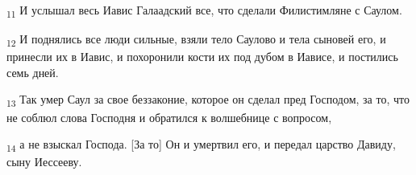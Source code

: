 \begin{tcolorbox}
\textsubscript{11} И услышал весь Иавис Галаадский все, что сделали Филистимляне с Саулом.
\end{tcolorbox}
\begin{tcolorbox}
\textsubscript{12} И поднялись все люди сильные, взяли тело Саулово и тела сыновей его, и принесли их в Иавис, и похоронили кости их под дубом в Иависе, и постились семь дней.
\end{tcolorbox}
\begin{tcolorbox}
\textsubscript{13} Так умер Саул за свое беззаконие, которое он сделал пред Господом, за то, что не соблюл слова Господня и обратился к волшебнице с вопросом,
\end{tcolorbox}
\begin{tcolorbox}
\textsubscript{14} а не взыскал Господа. [За то] Он и умертвил его, и передал царство Давиду, сыну Иессееву.
\end{tcolorbox}
